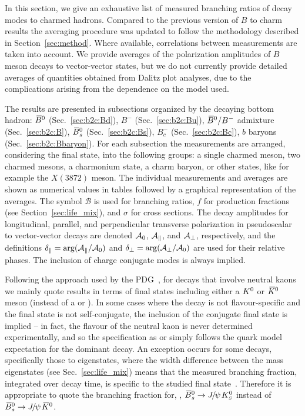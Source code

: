 In this section, we give an exhaustive list of measured branching ratios of decay modes to charmed hadrons.
Compared to the previous version of $B$ to charm results the averaging procedure was updated to follow the methodology described in Section~\ref{sec:method}.
Where available, correlations between measurements 
are taken into account.
We provide averages of the polarization amplitudes of $B$ meson decays to
vector-vector states, but we do not currently provide detailed averages of
quantities obtained from Dalitz plot analyses, due to the complications
arising from the dependence on the model used.

The results are presented in subsections organized by the decaying bottom
hadron: $\kern 0.18em\overline{\kern -0.18em B}{}^0$ (Sec.~\ref{sec:b2c:Bd}), $B^-$ (Sec.~\ref{sec:b2c:Bu}), $\kern 0.18em\overline{\kern -0.18em B}{}^0/B^-$ admixture (Sec.~\ref{sec:b2c:B}), $\kern 0.18em\overline{\kern -0.18em B}{}_s^0$ (Sec.~\ref{sec:b2c:Bs}), $B_c^-$ (Sec.~\ref{sec:b2c:Bc}), $b$ baryons (Sec.~\ref{sec:b2c:Bbaryon}).
For each subsection the measurements are arranged, considering the final state,
into the following groups: a single charmed meson, two charmed mesons, a
charmonium state, a charm baryon, or other states, like for example the
$X(3872)$ meson.
The individual measurements and averages are shown as numerical values in tables followed by a graphical representation of the averages.
The symbol $\mathcal{B}$ is used for branching ratios, $f$ for production fractions (see Section~\ref{sec:life_mix}), and $\sigma$ for cross sections.
The decay amplitudes for longitudinal, parallel, and perpendicular transverse polarization in pseudoscalar to vector-vector decays are denoted ${\cal{A}}_0$, ${\cal{A}}_\parallel$, and ${\cal{A}}_\perp$, respectively, and the definitions $\delta_\parallel = \arg({\cal{A}}_\parallel/{\cal{A}}_0)$ and $\delta_\perp = \arg({\cal{A}}_\perp/{\cal{A}}_0)$ are used for their relative phases.
The inclusion of charge conjugate modes is always implied.

Following the approach used by the PDG~\cite{PDG_2014}, for decays that involve
neutral kaons we mainly quote results in terms of final states including
either a $K^0$ or $\kern 0.2em\overline{\kern -0.2em K}{}^0$ meson (instead of a \KS or \KL).
In some cases where the decay is not flavour-specific and the final state is
not self-conjugate, the inclusion of the conjugate final state is implied --
in fact, the flavour of the neutral kaon is never determined experimentally,
and so the specification as \Kz or \Kzb simply follows the quark model
expectation for the dominant decay.
An exception occurs for some \Bs decays, specifically those to \CP
eigenstates, where the width difference between the mass eigenstates (see
Sec.~\ref{sec:life_mix}) means that the measured branching fraction,
integrated over decay time, is specific to the studied final
state~\cite{DeBruyn:2012wj}. 
Therefore it is appropriate to quote the branching fraction for, \eg, $\kern 0.18em\overline{\kern -0.18em B}{}_s^0 \to
{J\mskip -3mu/\mskip -2mu\psi\mskip 2mu} K^0_{\scriptscriptstyle S}$ instead of $\Bsb \to \jpsi \Kzb$.



